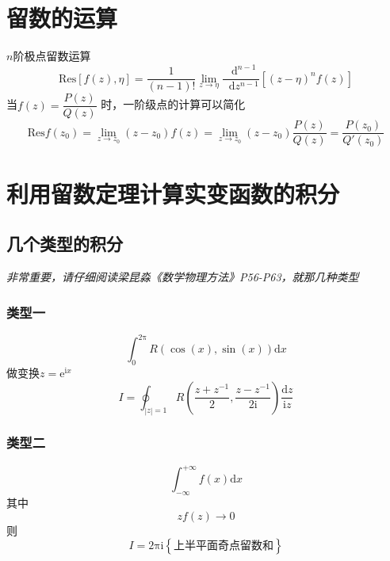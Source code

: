 \documentclass{article}
\newcommand*{\md}{\mathop{}\!\mathrm{d}}
\begin{document}
\section{留数的运算}
$n$阶极点留数运算
\begin{equation*}
  \mathrm{Res} \left[ f(z),\eta \right] = \dfrac{1}{(n - 1)!} \lim\limits_{z \rightarrow \eta} \dfrac{\md^{n-1}}{\md z^{n-1}} \left[ (z-\eta)^{n} f(z) \right]
\end{equation*}
当$f(z) = \dfrac{P(z)}{Q(z)} $ 时，一阶级点的计算可以简化
\begin{equation*}
  \mathrm{Res} f(z_{0}) = \lim\limits_{z \rightarrow z_{0}} (z - z_{0}) f(z) = \lim\limits_{z \rightarrow z_{0}} (z - z_{0}) \dfrac{P(z)}{Q(z)} =  \dfrac{P(z_{0})}{Q'(z_{0})} 
\end{equation*}

\section{利用留数定理计算实变函数的积分}

\subsection{几个类型的积分}



\emph{非常重要，请仔细阅读梁昆淼《数学物理方法》P56-P63，就那几种类型}

\subsubsection{类型一}

\begin{equation*}
  \int_{0}^{2\mathrm{\pi}} R \left( \cos(x),\sin(x) \right) \mathrm{d} x
\end{equation*}
做变换$z = \mathrm{e}^{\mathrm{i} x} $
\begin{equation*}
  I = \oint_{|z|=1} R \left( \dfrac{z+z^{-1}}{2} ,\dfrac{z-z^{-1}}{2 \mathrm{i}}  \right) \dfrac{\mathrm{d} z}{\mathrm{i} z} 
\end{equation*}

\subsubsection{类型二}

\begin{equation*}
  \int_{- \infty}^{+ \infty} f(x) \mathrm{d} x
\end{equation*}
其中
\begin{equation*}
  zf(z) \rightarrow  0 
\end{equation*}
则
\begin{equation*}
  I = 2 \mathrm{\pi} \mathrm{i} \left\{ \text{上半平面奇点留数和} \right\}
\end{equation*}
\end{document}
